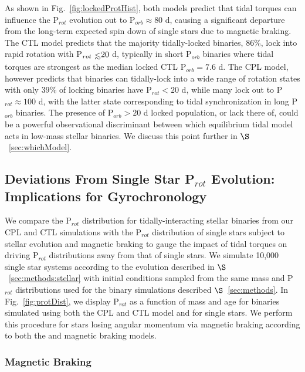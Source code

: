 \documentclass[twocolumn]{aastex61}
\def\lsim{~\rlap{$<$}{\lower 1.0ex\hbox{$\sim$}}}
\begin{document}
As shown in Fig.~\ref{fig:lockedProtHist}, both models predict that tidal torques can influence the P$_{rot}$ evolution out to P$_{orb} \approx 80$ d, causing a significant departure from the long-term expected spin down of single stars due to magnetic braking.  The CTL model predicts that the majority tidally-locked binaries, $86\%$, lock into rapid rotation with P$_{rot} \lsim 20$ d, typically in short P$_{orb}$ binaries where tidal torques are strongest as the median locked CTL P$_{orb} = 7.6$ d. The CPL model, however predicts that binaries can tidally-lock into a wide range of rotation states with only $39\%$ of locking binaries have P$_{rot} < 20$ d, while many lock out to P$_{rot} \approx 100$ d, with the latter state corresponding to tidal synchronization in long P$_{orb}$ binaries.  The presence of P$_{orb} > 20$ d locked population, or lack there of, could be a powerful observational discriminant between which equilibrium tidal model acts in low-mass stellar binaries.  We discuss this point further in $\S$~\ref{sec:whichModel}.

\subsection{Deviations From Single Star P$_{rot}$ Evolution: Implications for Gyrochronology} \label{sec:gyro}

We compare the P$_{rot}$ distribution for tidally-interacting stellar binaries from our CPL and CTL simulations with the P$_{rot}$ distribution of single stars subject to stellar evolution and magnetic braking to gauge the impact of tidal torques on driving P$_{rot}$ distributions away from that of single stars.  We simulate 10,000 single star systems according to the evolution described in $\S$~\ref{sec:methods:stellar} with initial conditions sampled from the same mass and P$_{rot}$ distributions used for the binary simulations described $\S$~\ref{sec:methods}. In Fig.~\ref{fig:protDist}, we display P$_{rot}$ as a function of mass and age for binaries simulated using both the CPL and CTL model and for single stars. We perform this procedure for stars losing angular momentum via magnetic braking according to both the \citet{Matt2015} and \citet{Reiners2012} magnetic braking models.

\subsubsection{\citet{Matt2015} Magnetic Braking}

\end{document}

